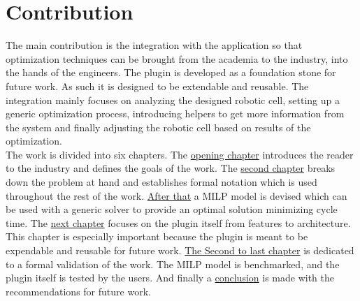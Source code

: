 \section{Contribution}

The main contribution is the integration with the application so that optimization techniques can be brought from the academia to the industry, into the hands of the engineers. The plugin is developed as a foundation stone for future work. As such it is designed to be extendable and reusable. The integration mainly focuses on analyzing the designed robotic cell, setting up a generic optimization process, introducing helpers to get more information from the system and finally adjusting the robotic cell based on results of the optimization. \\

The work is divided into six chapters. The \href{ch:introduction}{opening chapter} introduces the reader to the industry and defines the goals of the work. The \href{ch:problem_statement}{second chapter} breaks down the problem at hand and establishes formal notation which is used throughout the rest of the work. \href{ch:milp_model}{After that} a MILP model is devised which can be used with a generic solver to provide an optimal solution minimizing cycle time. The \href{ch:integration}{next chapter} focuses on the plugin itself from features to architecture. This chapter is especially important because the plugin is meant to be expendable and reusable for future work. \href{ch:experiments}{The Second to last chapter} is dedicated to a formal validation of the work. The MILP model is benchmarked, and the plugin itself is tested by the users. And finally a \href{ch:conclusion}{conclusion} is made with the recommendations for future work.    